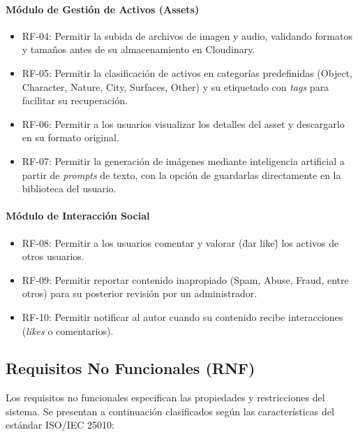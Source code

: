\paragraph{Módulo de Gestión de Activos (Assets)}
\begin{itemize}
    \item RF-04: Permitir la subida de archivos de imagen y audio, validando formatos y tamaños antes de su almacenamiento en Cloudinary.
    \item RF-05: Permitir la clasificación de activos en categorías predefinidas (Object, Character, Nature, City, Surfaces, Other) y su etiquetado con \textit{tags} para facilitar su recuperación.
    \item RF-06: Permitir a los usuarios visualizar los detalles del asset y descargarlo en su formato original.
    \item RF-07: Permitir la generación de imágenes mediante inteligencia artificial a partir de \textit{prompts} de texto, con la opción de guardarlas directamente en la biblioteca del usuario.
\end{itemize}

\paragraph{Módulo de Interacción Social}
\begin{itemize}
    \item RF-08: Permitir a los usuarios comentar y valorar (\"dar like\") los activos de otros usuarios.
    \item RF-09: Permitir reportar contenido inapropiado (Spam, Abuse, Fraud, entre otros) para su posterior revisión por un administrador.
    \item RF-10: Permitir notificar al autor cuando su contenido recibe interacciones (\textit{likes} o comentarios).
\end{itemize}

\subsection{Requisitos No Funcionales (RNF)}

Los requisitos no funcionales especifican las propiedades y restricciones del sistema. Se presentan a continuación clasificados según las características del estándar ISO/IEC 25010:

